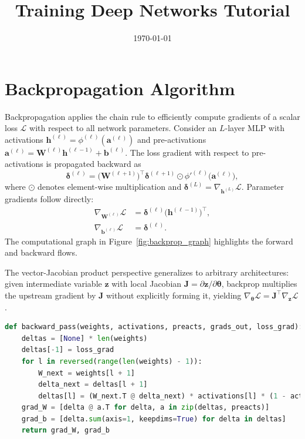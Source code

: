 ﻿\documentclass[12pt]{article}
\title{Training Deep Networks Tutorial}
\author{}
\date{\today}
\begin{document}
\maketitle

\section{Backpropagation Algorithm}
Backpropagation applies the chain rule to efficiently compute gradients of a scalar loss $\mathcal{L}$ with respect to all network parameters. Consider an $L$-layer MLP with activations $\mathbf{h}^{(\ell)} = \phi^{(\ell)}(\mathbf{a}^{(\ell)})$ and pre-activations $\mathbf{a}^{(\ell)} = \mathbf{W}^{(\ell)} \mathbf{h}^{(\ell-1)} + \mathbf{b}^{(\ell)}$. The loss gradient with respect to pre-activations is propagated backward as
\begin{equation}
  \boldsymbol{\delta}^{(\ell)} = \bigl(\mathbf{W}^{(\ell+1)}\bigr)^{\top} \boldsymbol{\delta}^{(\ell+1)} \odot \phi'^{(\ell)}\bigl(\mathbf{a}^{(\ell)}\bigr),
\end{equation}
where $\odot$ denotes element-wise multiplication and $\boldsymbol{\delta}^{(L)} = \nabla_{\mathbf{h}^{(L)}} \mathcal{L}$. Parameter gradients follow directly:
\begin{align}
  \nabla_{\mathbf{W}^{(\ell)}} \mathcal{L} &= \boldsymbol{\delta}^{(\ell)} \bigl(\mathbf{h}^{(\ell-1)}\bigr)^{\top}, \\
  \nabla_{\mathbf{b}^{(\ell)}} \mathcal{L} &= \boldsymbol{\delta}^{(\ell)}.
\end{align}
The computational graph in Figure~\ref{fig:backprop_graph} highlights the forward and backward flows.

The vector-Jacobian product perspective generalizes to arbitrary architectures: given intermediate variable $\mathbf{z}$ with local Jacobian $\mathbf{J} = \partial \mathbf{z} / \partial \boldsymbol{\theta}$, backprop multiplies the upstream gradient by $\mathbf{J}$ without explicitly forming it, yielding $\nabla_{\boldsymbol{\theta}} \mathcal{L} = \mathbf{J}^{\top} \nabla_{\mathbf{z}} \mathcal{L}$.

\begin{lstlisting}[language=Python, caption={Mini-batch backprop for a dense network.}]
def backward_pass(weights, activations, preacts, grads_out, loss_grad):
    deltas = [None] * len(weights)
    deltas[-1] = loss_grad
    for l in reversed(range(len(weights) - 1)):
        W_next = weights[l + 1]
        delta_next = deltas[l + 1]
        deltas[l] = (W_next.T @ delta_next) * activations[l] * (1 - activations[l])
    grad_W = [delta @ a.T for delta, a in zip(deltas, preacts)]
    grad_b = [delta.sum(axis=1, keepdims=True) for delta in deltas]
    return grad_W, grad_b
\end{lstlisting}
\end{document}
